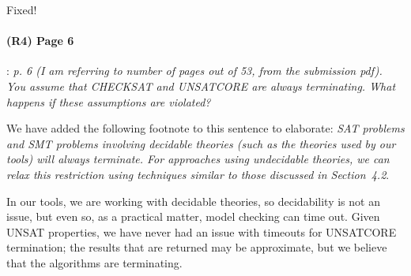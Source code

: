 \documentclass{article}
\begin{document}
Fixed!

\paragraph{(R4) Page 6}: \textit{p. 6 (I am referring to number of pages out of 53, from the submission pdf). You assume that CHECKSAT and UNSATCORE are
always terminating. What happens if these assumptions are violated?}
\vspace{0.05in}

\noindent We have added the following footnote to this sentence to elaborate: \textit{SAT problems and SMT problems involving decidable theories (such as the theories used by our tools) will always terminate.  For approaches using undecidable theories, we can relax this restriction using  techniques similar to those discussed in Section~4.2}.


In our tools, we are working with decidable theories, so decidability is not an issue, but even so, as a practical matter, model checking can time out.  Given UNSAT properties, we have never had an issue with timeouts for UNSATCORE termination; the results that are returned may be approximate, but we believe that the algorithms are terminating.
\end{document}
